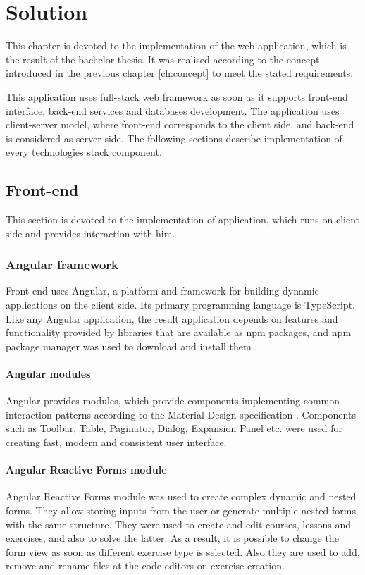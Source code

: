 \chapter[Solution]{Solution}
\label{ch:solution}
This chapter is devoted to the implementation of the web application, which is the result of the bachelor thesis. It was realised according to the concept introduced in the previous chapter \ref{ch:concept}  to meet the stated requirements.

This application uses full-stack web framework as soon as it supports front-end interface, back-end services and databases development. The application uses client-server model, where front-end corresponds to the client side, and back-end is considered as server side. The following sections describe implementation of every technologies stack component.

    \section{Front-end}
    This section is devoted to the implementation of application, which runs on client side and provides interaction with him.
    
        \subsection{Angular framework}
        Front-end uses Angular, a platform and framework for building dynamic applications on the client side. Its primary programming language is TypeScript. Like any Angular application, the result application depends on features and functionality provided by libraries that are available as npm packages, and npm package manager was used to download and install them \cite[Node.js]{angular_getting_started}.
        
            \subsubsection{Angular modules}
            Angular provides modules, which provide components implementing common interaction patterns according to the Material Design specification \cite[Components]{angular_components}. Components such as Toolbar, Table, Paginator, Dialog, Expansion Panel etc. were used for creating fast, modern and consistent user interface.
    
            \subsubsection{Angular Reactive Forms module}
            Angular Reactive Forms module was used to create complex dynamic and nested forms. They allow storing inputs from the user or generate multiple nested forms with the same structure. They were used to create and edit courses, lessons and exercises, and also to solve the latter. As a result, it is possible to change the form view as soon as different exercise type is selected. Also they are used to add, remove and rename files at the code editors on exercise creation.
            

